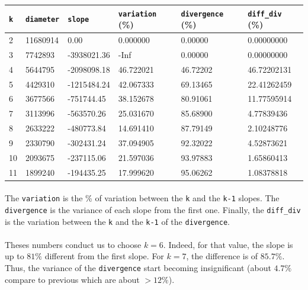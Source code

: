 \begin{tabular}{|l|l|l|l|l|l|}
\hline \texttt{k} & \texttt{diameter} & \texttt{slope} & \texttt{variation} (\%) & \texttt{divergence} (\%) & \texttt{diff\_div} (\%) \\ 
\hline 2 & 11680914 & 0.00 & 0.000000 & 0.00000 & 0.00000000 \\ 
\hline 3 & 7742893 & -3938021.36 & -Inf & 0.00000 & 0.00000000 \\ 
\hline 4 & 5644795 & -2098098.18 & 46.722021 & 46.72202 & 46.72202131 \\ 
\hline 5 & 4429310 & -1215484.24 & 42.067333 & 69.13465 & 22.41262459 \\ 
\hline 6 & 3677566 & -751744.45 & 38.152678 & 80.91061 & 11.77595914 \\ 
\hline 7 & 3113996 & -563570.26 & 25.031670 & 85.68900 & 4.77839436 \\ 
\hline 8 & 2633222 & -480773.84 & 14.691410 & 87.79149 & 2.10248776 \\ 
\hline 9 & 2330790 & -302431.24 & 37.094905 & 92.32022 & 4.52873621 \\ 
\hline 10 & 2093675 & -237115.06 & 21.597036 & 93.97883 & 1.65860413 \\ 
\hline 11 & 1899240 & -194435.25 & 17.999620 & 95.06262 & 1.08378818 \\ 
\hline 
\end{tabular} 

\paragraph{}The \texttt{variation} is the \% of variation between the \texttt{k} and the \texttt{k-1} slopes. The \texttt{divergence} is the variance of each slope from the first one. Finally, the \texttt{diff\_div} is the variation between the \texttt{k} and the \texttt{k-1} of the \texttt{divergence}.

\paragraph{}Theses numbers conduct us to choose $k=6$. Indeed, for that value, the slope is up to $81\%$ different from the first slope. For $k=7$, the difference is of $85.7\%$. Thus, the variance of the \texttt{divergence} start becoming insignificant (about $4.7\%$ compare to previous which are about $>12\%$).

